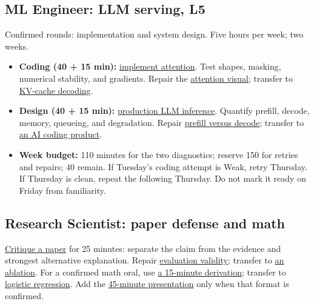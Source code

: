 \documentclass[10pt,letterpaper]{article}
\begin{document}
\subsection*{ML Engineer: LLM serving, L5}
Confirmed rounds: implementation and system design. Five hours per week; two weeks.
\begin{itemize}
  \item \textbf{Coding (40 + 15 min):} \href{https://mlmentorship.com/questions/implement-attention-from-scratch/?practice=1}{implement attention}. Test shapes, masking, numerical stability, and gradients. Repair the \href{https://mlmentorship.com/review/\#attention-mechanism}{attention visual}; transfer to \href{https://mlmentorship.com/questions/implement-kv-cache-decode/?practice=1}{KV-cache decoding}.
  \item \textbf{Design (40 + 15 min):} \href{https://mlmentorship.com/questions/design-production-llm-inference-service/?practice=1}{production LLM inference}. Quantify prefill, decode, memory, queueing, and degradation. Repair \href{https://mlmentorship.com/review/\#prefill-vs-decode}{prefill versus decode}; transfer to \href{https://mlmentorship.com/questions/design-ai-coding-product/?practice=1}{an AI coding product}.
  \item \textbf{Week budget:} 110 minutes for the two diagnostics; reserve 150 for retries and repairs; 40 remain. If Tuesday's coding attempt is Weak, retry Thursday. If Thursday is clean, repeat the following Thursday. Do not mark it ready on Friday from familiarity.
\end{itemize}

\subsection*{Research Scientist: paper defense and math}
\href{https://mlmentorship.com/questions/critique-ml-paper/?practice=1}{Critique a paper} for 25 minutes: separate the claim from the evidence and strongest alternative explanation. Repair \href{https://mlmentorship.com/review/\#evaluation-validity-benchmark-contamination}{evaluation validity}; transfer to \href{https://mlmentorship.com/questions/design-ablation-study/?practice=1}{an ablation}. For a confirmed math oral, use \href{https://mlmentorship.com/questions/derive-ml-math-under-pressure/?practice=1}{a 15-minute derivation}; transfer to \href{https://mlmentorship.com/questions/derive-logistic-regression/?practice=1}{logistic regression}. Add the \href{https://mlmentorship.com/questions/present-technical-ml-project/?practice=1}{45-minute presentation} only when that format is confirmed.
\end{document}
